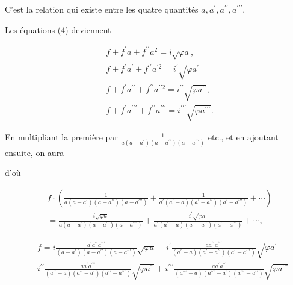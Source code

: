 \documentclass{article}
\begin{document}
C'est la relation qui existe entre les quatre quantités \(a, a^{\prime}, a^{\prime \prime}, a^{\prime \prime \prime}\).

Les équations (4) deviennent

\[
\begin{aligned}
& f+f^{\prime} a+f^{\prime \prime} a^{2}=i \sqrt{\varphi a}, \\
& f+f^{\prime} a^{\prime}+f^{\prime \prime} a^{\prime 2}=i^{\prime} \sqrt{\varphi a^{\prime}} \\
& f+f^{\prime} a^{\prime \prime}+f^{\prime \prime} a^{\prime \prime 2}=i^{\prime \prime} \sqrt{\varphi a^{\prime \prime}}, \\
& f+f^{\prime} a^{\prime \prime \prime}+f^{\prime \prime} a^{\prime \prime \prime}=i^{\prime \prime \prime} \sqrt{\varphi a^{\prime \prime \prime}} .
\end{aligned}
\]

En multipliant la première par \(\frac{1}{a\left(a-a^{\prime}\right)\left(a-a^{\prime \prime}\right)\left(a-a^{\prime \prime \prime}\right)}\) etc., et en ajoutant ensuite, on aura

d'où

\[
\begin{aligned}
& f \cdot\left(\frac{1}{a\left(a-a^{\prime}\right)\left(a-a^{\prime \prime}\right)\left(a-a^{\prime \prime \prime}\right)}+\frac{1}{a^{\prime}\left(a^{\prime}-a\right)\left(a^{\prime}-a^{\prime \prime}\right)\left(a^{\prime}-a^{\prime \prime \prime}\right)}+\cdots\right) \\
& =\frac{i \sqrt{\varphi a}}{a\left(a-a^{\prime}\right)\left(a-a^{\prime \prime}\right)\left(a-a^{\prime \prime \prime}\right)}+\frac{i^{\prime} \sqrt{\varphi a^{\prime}}}{a^{\prime}\left(a^{\prime}-a\right)\left(a^{\prime}-a^{\prime \prime}\right)\left(a^{\prime}-a^{\prime \prime \prime}\right)}+\cdots,
\end{aligned}
\]

\[
\begin{aligned}
& -f=i \frac{a^{\prime} a^{\prime \prime} a^{\prime \prime \prime}}{\left(a-a^{\prime}\right)\left(a-a^{\prime \prime}\right)\left(a-a^{\prime \prime \prime}\right)} \sqrt{\varphi a}+i^{\prime} \frac{a a^{\prime \prime} a^{\prime \prime \prime}}{\left(a^{\prime}-a\right)\left(a^{\prime}-a^{\prime \prime}\right)\left(a^{\prime}-a^{\prime \prime \prime}\right)} \sqrt{\varphi a^{\prime}} \\
& +i^{\prime \prime} \frac{a a^{\prime} a^{\prime \prime \prime}}{\left(a^{\prime \prime}-a\right)\left(a^{\prime \prime}-a^{\prime}\right)\left(a^{\prime \prime}-a^{\prime \prime \prime}\right)} \sqrt{\varphi a^{\prime \prime}}+i^{\prime \prime \prime} \frac{a a^{\prime} a^{\prime \prime}}{\left(a^{\prime \prime \prime}-a\right)\left(a^{\prime \prime \prime}-a^{\prime}\right)\left(a^{\prime \prime \prime}-a^{\prime \prime}\right)} \sqrt{\varphi a^{\prime \prime \prime}}
\end{aligned}
\]
\end{document}
